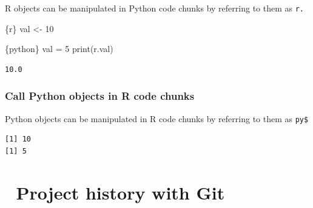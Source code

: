 \documentclass[
  letterpaper,
  DIV=11,
  numbers=noendperiod,
  oneside]{scrreprt}
\newenvironment{Shaded}{\begin{snugshade}}{\end{snugshade}}
\newcommand{\BuiltInTok}[1]{\textcolor[rgb]{0.00,0.23,0.31}{#1}}
\newcommand{\DecValTok}[1]{\textcolor[rgb]{0.68,0.00,0.00}{#1}}
\newcommand{\FunctionTok}[1]{\textcolor[rgb]{0.28,0.35,0.67}{#1}}
\newcommand{\InformationTok}[1]{\textcolor[rgb]{0.37,0.37,0.37}{#1}}
\newcommand{\NormalTok}[1]{\textcolor[rgb]{0.00,0.23,0.31}{#1}}
\newcommand{\OperatorTok}[1]{\textcolor[rgb]{0.37,0.37,0.37}{#1}}
\newcommand{\OtherTok}[1]{\textcolor[rgb]{0.00,0.23,0.31}{#1}}
\newcommand{\SpecialCharTok}[1]{\textcolor[rgb]{0.37,0.37,0.37}{#1}}
\begin{document}
R objects can be manipulated in Python code chunks by referring to them
as \texttt{r.}

\begin{Shaded}
\begin{Highlighting}[]
\InformationTok{\textasciigrave{}\textasciigrave{}\textasciigrave{}\{r\}}
\NormalTok{val }\OtherTok{\textless{}{-}} \DecValTok{10}
\InformationTok{\textasciigrave{}\textasciigrave{}\textasciigrave{}}
\end{Highlighting}
\end{Shaded}

\begin{Shaded}
\begin{Highlighting}[]
\InformationTok{\textasciigrave{}\textasciigrave{}\textasciigrave{}\{python\}}
\NormalTok{val }\OperatorTok{=} \DecValTok{5}
\BuiltInTok{print}\NormalTok{(r.val)}
\InformationTok{\textasciigrave{}\textasciigrave{}\textasciigrave{}}
\end{Highlighting}
\end{Shaded}

\begin{verbatim}
10.0
\end{verbatim}

\hypertarget{call-python-objects-in-r-code-chunks}{%
\subsection{Call Python objects in R code
chunks}\label{call-python-objects-in-r-code-chunks}}

Python objects can be manipulated in R code chunks by referring to them
as \texttt{py\$}

\begin{Shaded}
\end{Shaded}

\begin{verbatim}
[1] 10
[1] 5
\end{verbatim}

\hypertarget{project-history-with-git}{%
\chapter{\texorpdfstring{{📘} Project history with
Git}{📘 Project history with Git}}\label{project-history-with-git}}
\end{document}
